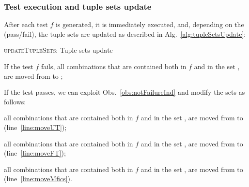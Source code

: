 \begin{tikzborder}{\cite{Gargantini16:validation}}
\begin{tikzborder}{\cite{gargantini_combinatorial_2017}}
\begin{tikzborder}{\cite{gargantini_combinatorial_2017}}
\begin{tikzborder}{\cite{garn2019}}
\begin{tikzborder}{\cite{arcaini2019achieving}}
\subsubsection{Test execution and tuple sets update}

\begin{tikzborder}{}
After each test $f$ is generated, it is immediately executed, and, depending on the \result (pass/fail), the tuple sets are updated as described in Alg.~\ref{alg:tupleSetsUpdate}:
\end{tikzborder}
%
\begin{algorithm}[!htb]
	\begin{algorithmic}[1]
		\Else
		\label{line:moveUT}
		\label{line:moveFT}
		\label{line:moveMfics}
		\EndIf
		
		\vspace{10pt}
		\State{$\sourceSet \gets \sourceSet \setminus \toMove$}
		\State{$\destSet \gets \destSet \cup \toMove$}
		\EndProcedure
	\end{algorithmic}
	\caption{\textsc{updateTupleSets}: Tuple sets update}
	\label{alg:tupleSetsUpdate}
\end{algorithm}
%
\begin{tikzborder}{}
\begin{compactenum}
	\item If the test $f$ fails, all combinations that are contained both in $f$ and in the set \ut, are moved from \ut to \ft;
	\item If the test passes, we can exploit Obs.~\ref{obs:notFailureInd} and modify the sets as follows:
	\begin{compactenum}
		\item all combinations that are contained both in $f$ and in the set \ut, are moved from \ut to \pt (line~\ref{line:moveUT});
		\item all combinations that are contained both in $f$ and in the set \ft, are moved from \ft to \pt (line~\ref{line:moveFT});
		\item all combinations that are contained both in $f$ and in the set \isoMficsSet, are moved from \isoMficsSet to \pt (line~\ref{line:moveMfics}).
	\end{compactenum}
\end{compactenum}


\end{tikzborder}
\end{tikzborder}
\end{tikzborder}
\end{tikzborder}
\end{tikzborder}
\end{tikzborder}
